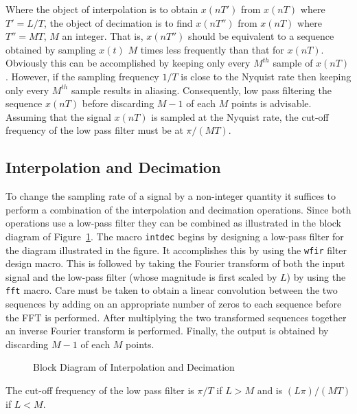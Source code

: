 	Where the object of interpolation is to obtain $x(nT')$
from $x(nT)$ where $T'=L/T$, the object of decimation is
to find $x(nT'')$ from $x(nT)$ where $T''=MT$, $M$ an integer.
That is, $x(nT'')$ should be equivalent to a sequence obtained
by sampling $x(t)$ $M$ times less frequently than that for $x(nT)$.
Obviously this can be accomplished by keeping only every $M^{th}$
sample of $x(nT)$.  However, if the sampling frequency $1/T$ is
close to the Nyquist rate then keeping only every $M^{th}$
sample results in aliasing.  Consequently, low pass filtering
the sequence $x(nT)$ before discarding $M-1$ of each $M$ points is 
advisable.  Assuming that the signal $x(nT)$ is
sampled at the Nyquist rate, the cut-off frequency of the low pass filter
must be at $\pi/(MT)$.

\subsection{Interpolation and Decimation}

	To change the sampling rate of a signal by a non-integer
quantity it suffices to perform a combination of the interpolation
and decimation operations.  Since both operations use a low-pass filter they
can be combined as illustrated in the block diagram of Figure~\ref{f44.1}.
The macro {\tt intdec} begins by designing a low-pass filter for the 
diagram illustrated in the figure.  It accomplishes this by using
the {\tt wfir} filter design macro.  This is followed by taking the
Fourier transform of both the input signal and the low-pass filter
(whose magnitude is first scaled by $L$)
by using the {\tt fft} macro.  Care must be taken to obtain a linear
convolution between the two sequences by adding on an appropriate number
of zeros to each sequence before the FFT is performed.  After multiplying
the two transformed sequences together an inverse Fourier transform
is performed.  Finally, the output is obtained by discarding $M-1$
of each $M$ points.
%
\begin{figure}[tb]
\caption{ Block Diagram of Interpolation and Decimation}
\label{f44.1}
\end{figure}
%
The cut-off frequency of the low pass filter is $\pi/T$
if $L>M$ and is $(L\pi)/(MT)$ if $L<M$.

